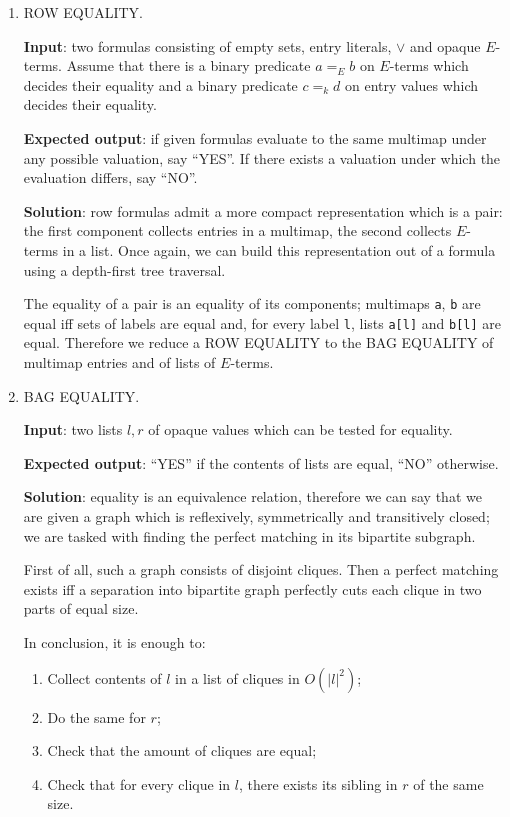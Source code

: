 \documentclass[a4paper,14pt]{extreport}
\begin{document}
\begin{enumerate}
    \item ROW EQUALITY.

        \textbf{Input}: two formulas consisting of empty sets, entry literals,
        $\lor$ and opaque $E$-terms. Assume that there is a binary predicate
        $a =_E b$ on $E$-terms which decides their equality and a binary
        predicate $c =_k d$ on entry values which decides their equality.

        \textbf{Expected output}: if given formulas evaluate to the same
        multimap under any possible valuation, say ``YES''. If there exists a
        valuation under which the evaluation differs, say ``NO''.

        \textbf{Solution}: row formulas admit a more compact representation
        which is a pair: the first component collects entries in a multimap, the
        second collects $E$-terms in a list. Once again, we can build this
        representation out of a formula using a depth-first tree traversal.

        The equality of a pair is an equality of its components; multimaps
        \verb|a|, \verb|b| are equal iff sets of labels are equal and, for every
        label \verb|l|, lists \verb|a[l]| and \verb|b[l]| are equal. Therefore
        we reduce a ROW EQUALITY to the BAG EQUALITY of multimap entries and of
        lists of $E$-terms.

    \item BAG EQUALITY.

        \textbf{Input}: two lists $l, r$ of opaque values which can be tested
        for equality.

        \textbf{Expected output}: ``YES'' if the contents of lists are equal,
        ``NO'' otherwise.

        \textbf{Solution}: equality is an equivalence relation, therefore we can
        say that we are given a graph which is reflexively, symmetrically and
        transitively closed; we are tasked with finding the perfect matching in
        its bipartite subgraph.

        First of all, such a graph consists of disjoint cliques. Then a perfect
        matching exists iff a separation into bipartite graph perfectly cuts
        each clique in two parts of equal size.

        In conclusion, it is enough to:
        \begin{enumerate}
            \item Collect contents of $l$ in a list of cliques in $O(|l|^2)$;
            \item Do the same for $r$;
            \item Check that the amount of cliques are equal;
            \item Check that for every clique in $l$, there exists its sibling
                in $r$ of the same size.
        \end{enumerate}
\end{enumerate}
\end{document}

